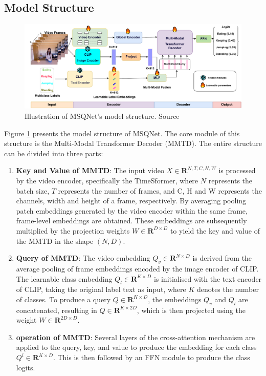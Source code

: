\subsection{Model Structure}
\begin{figure}[ht]
    \centering
    \includegraphics[width=1.0\textwidth]{assets/charts_rw/MSQNet}
    \caption[Model Structure of MSQNet]{Illustration of MSQNet's model structure. Source \parencite{mondal2023msqnet}}
    \label{fig:discussion_msqnet}
\end{figure}

Figure \ref{fig:discussion_msqnet} presents the model structure of MSQNet. The core module of this structure is the Multi-Modal Transformer Decoder (MMTD). The entire structure can be divided into three parts: 

\begin{enumerate}
    \item \textbf{Key and Value of MMTD}: The input video $X \in \mathbf{R}^{N, T, C, H, W}$ is processed by the video encoder, specifically the TimeSformer, where $N$ represents the batch size, $T$ represents the number of frames, and C, H and W represents the channels, width and height of a frame, respectively. By averaging pooling patch embeddings generated by the video encoder within the same frame, frame-level embeddings are obtained. These embeddings are subsequently multiplied by the projection weights $W \in \mathbf{R}^{D \times D}$ to yield the key and value of the MMTD in the shape $(N, D)$. 
    \item \textbf{Query of MMTD}: The video embedding $Q_v \in \mathbf{R}^{N \times D}$ is derived from the average pooling of frame embeddings encoded by the image encoder of CLIP. The learnable class embedding $Q_l \in \mathbf{R}^{K \times D}$ is initialised with the text encoder of CLIP, taking the original label text as input, where $K$ denotes the number of classes. To produce a query $Q \in \mathbf{R}^{K \times D}$, the embeddings $Q_v$ and $Q_l$ are concatenated, resulting in $Q \in \mathbf{R}^{K \times 2D}$, which is then projected using the weight $W \in \mathbf{R}^{2D \times D}$. 
    \item \textbf{operation of MMTD}: Several layers of the cross-attention mechanism are applied to the query, key, and value to produce the embedding for each class $Q^l \in \mathbf{R}^{K \times D}$. This is then followed by an FFN module to produce the class logits.
\end{enumerate}

